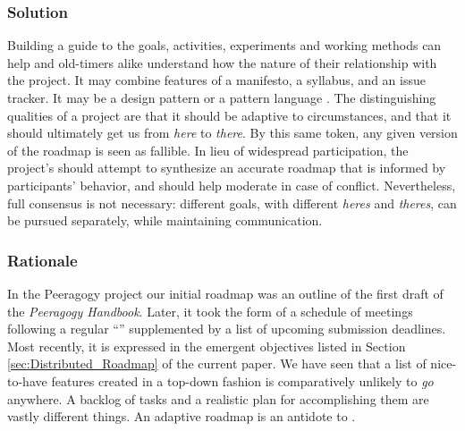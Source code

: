 \subsubsection*{Solution}  Building a guide to the goals, activities, experiments and working methods can help  and old-timers alike understand how the nature of their relationship with the project.  %
It may combine features of a manifesto, a syllabus, and an issue tracker.  It may be a design pattern or a pattern language \cite{kohls2010structure}.  The distinguishing qualities of a project  are that it should be adaptive to circumstances, and that it should ultimately get us from \emph{here} to \emph{there}.  By this same token, any given version of the roadmap is seen as fallible.  %
In lieu of widespread participation, the project's  should attempt to synthesize an accurate roadmap that is informed by participants' behavior, and should help moderate in case of conflict.  Nevertheless, full consensus is not necessary: different goals, with different \emph{heres} and \emph{theres}, can be pursued separately, while maintaining communication.

\subsubsection*{Rationale} 
In the Peeragogy project our initial roadmap was an outline of the
first draft of the \emph{Peeragogy Handbook}.  Later, it took the form
of a schedule of meetings following a regular
``'' supplemented by a list of upcoming
submission deadlines.  Most recently, it is expressed in the emergent
objectives listed in Section \ref{sec:Distributed_Roadmap} of the
current paper.  We have seen that a list of nice-to-have features created
in a top-down fashion is comparatively unlikely to \emph{go} anywhere.
A backlog of tasks and a realistic plan for accomplishing them are
vastly different things.  An adaptive roadmap is an
antidote to 
\cite[pp. 121--124]{david2001software}. 

